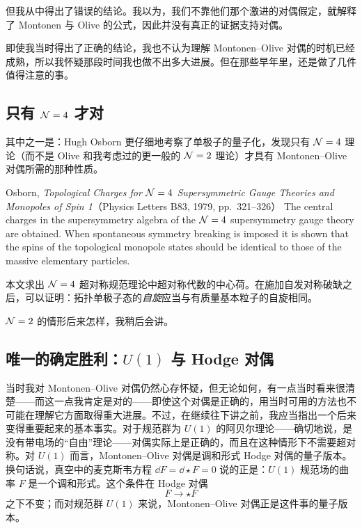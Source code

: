 \noindent 但我从中得出了错误的结论。我以为，我们不靠他们那个激进的对偶假定，就解释了 Montonen 与 Olive 的公式，因此并没有真正的证据支持对偶。

即使我当时得出了正确的结论，我也不认为理解 Montonen--Olive 对偶的时机已经成熟，所以我怀疑那段时间我也做不出多大进展。但在那些早年里，还是做了几件值得注意的事。

\subsection{只有 $\mathcal{N}=4$ 才对}

其中之一是：Hugh Osborn 更仔细地考察了单极子的量子化，发现只有 $\mathcal{N}=4$ 理论（而不是 Olive 和我考虑过的更一般的 $\mathcal{N}=2$ 理论）才具有 Montonen--Olive 对偶所需的那种性质。

\begin{abstractbox}{Osborn, \emph{Topological Charges for $\mathcal{N}=4$ Supersymmetric Gauge Theories and Monopoles of Spin 1}（Physics Letters B83, 1979, pp.~321--326）}
The central charges in the supersymmetry algebra of the $\mathcal{N}=4$ supersymmetry gauge theory are obtained. When spontaneous symmetry breaking is imposed it is shown that the spins of the topological monopole states should be identical to those of the massive elementary particles.

\medskip
本文求出 $\mathcal{N}=4$ 超对称规范理论中超对称代数的中心荷。在施加自发对称破缺之后，可以证明：拓扑单极子态的\emph{自旋}应当与有质量基本粒子的自旋相同。
\end{abstractbox}

\noindent $\mathcal{N}=2$ 的情形后来怎样，我稍后会讲。

\subsection{唯一的确定胜利：$U(1)$ 与 Hodge 对偶}

当时我对 Montonen--Olive 对偶仍然心存怀疑，但无论如何，有一点当时看来很清楚——而这一点我肯定是对的——即使这个对偶是正确的，用当时可用的方法也不可能在理解它方面取得重大进展。不过，在继续往下讲之前，我应当指出一个后来变得重要起来的基本事实。对于规范群为 $U(1)$ 的阿贝尔理论——确切地说，是没有带电场的“自由”理论——对偶实际上是正确的，而且在这种情形下不需要超对称。对 $U(1)$ 而言，Montonen--Olive 对偶是调和形式 Hodge 对偶的量子版本。换句话说，真空中的麦克斯韦方程 $\dd F=\dd\star F=0$ 说的正是：$U(1)$ 规范场的曲率 $F$ 是一个调和形式。这个条件在 Hodge 对偶
\[
  F\longrightarrow \star F
\]
之下不变；而对规范群 $U(1)$ 来说，Montonen--Olive 对偶正是这件事的量子版本。

